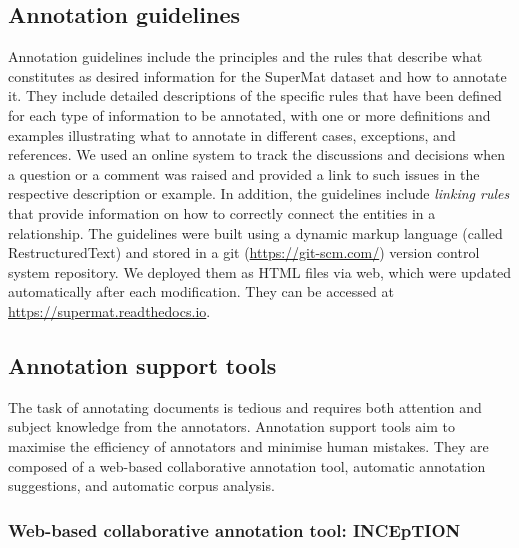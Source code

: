 \subsection{Annotation guidelines}
\label{subsec:annotation-guidelines}
Annotation guidelines include the principles and the rules that describe what constitutes as desired information for the SuperMat dataset and how to annotate it. They include detailed descriptions of the specific rules that have been defined for each type of information to be annotated, with one or more definitions and examples illustrating what to annotate in different cases, exceptions, and references. We used an online system to track the discussions and decisions when a question or a comment was raised and provided a link to such issues in the respective description or example. 
In addition, the guidelines include \textit{linking rules} that provide information on how to correctly connect the entities in a relationship. 
The guidelines were built using a dynamic markup language (called RestructuredText) and stored in a git (\url{https://git-scm.com/}) version control system repository. We deployed them as HTML files via web, which were updated automatically after each modification. They can be accessed at \url{https://supermat.readthedocs.io}.

\subsection{Annotation support tools}
\label{subsec:annotation-support-tool}
The task of annotating documents is tedious and requires both attention and subject knowledge from the annotators.
Annotation support tools aim to maximise the efficiency of annotators and minimise human mistakes. 
They are composed of a web-based collaborative annotation tool, automatic annotation suggestions, and automatic corpus analysis. 

\subsubsection{Web-based collaborative annotation tool: INCEpTION}
\label{subsec:annotation-tool}

